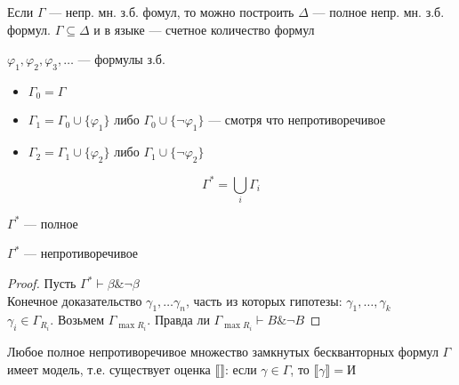 \documentclass[oneside]{book}
\begin{document}
\begin{theorem}
	Если \(\Gamma\) --- непр. мн. з.б. фомул, то можно построить \(\Delta\) --- полное непр. мн. з.б. формул. \(\Gamma \subseteq \Delta\) и в языке --- счетное количество формул
	\label{orgd2cb150}
\end{theorem}
\begin{definition}
	\(\varphi_1, \varphi_2, \varphi_3, \dots\) --- формулы з.б. \\
	\begin{itemize}
		\item \(\Gamma_0 = \Gamma\)
		\item \(\Gamma_1 = \Gamma_0 \cup \{\varphi_1\}\) либо \(\Gamma_0 \cup \{\neg \varphi_1\}\) --- смотря что непротиворечивое
		\item \(\Gamma_2 = \Gamma_1 \cup \{\varphi_2\}\) либо \(\Gamma_1 \cup \{\neg \varphi_2\}\)
	\end{itemize}
	\[ \Gamma^* = \bigcup_i \Gamma_i \]
	\label{orga1e421d}
\end{definition}
\begin{property}
	\(\Gamma^*\) --- полное
	\label{orgad3a9c8}
\end{property}
\begin{property}
	\(\Gamma^*\) --- непротиворечивое
	\label{org261112e}
\end{property}
\begin{proof}
	Пусть \(\Gamma^* \vdash \beta \& \neg \beta\) \\
	Конечное доказательство \(\gamma_1, \dots \gamma_n\), часть из которых гипотезы: \(\gamma_1, \dots, \gamma_k\) \\
	\(\gamma_i \in \Gamma_{R_i}\). Возьмем \(\Gamma_{\max{R_i}}\). Правда ли \(\Gamma_{\max{R_i}} \vdash B \& \neg B\)
\end{proof}
\begin{theorem}
	Любое полное непротиворечивое множество замкнутых бескванторных формул \(\Gamma\) имеет модель, т.е. существует оценка \(\llbracket \rrbracket\): если \(\gamma \in \Gamma\), то \(\llbracket \gamma \rrbracket = \text{И}\)
	\label{org7f30c8f}
\end{theorem}
\end{document}
